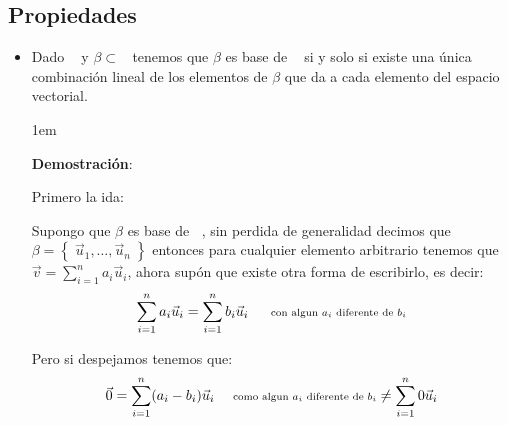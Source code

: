 \documentclass[12pt, fleqn]{report}                             %
\newenvironment{SmallIndentation}[1][0.75em]                    %
        {\begin{adjustwidth}{#1}{}\begin{footnotesize}}             %
        {\end{footnotesize}\end{adjustwidth}}                       %
\DeclareMathOperator \Space {\quad}                             %
\newcommand \Remember[1]{\Space\text{\scriptsize{#1}}}          %
\theoremstyle{break}                                            %
\DeclareMathOperator \GenericField {\mathbb{F}}                 %
\DeclareMathOperator \VectorSet    {\mathbb{V}}                 %
\DeclareMathOperator \VectorSpace  {\VectorSet_{\GenericField}} %
\newcommand{\Set}[1]    {\left\{ \; #1 \; \right\}}             %
\begin{document}
            \clearpage
            \subsection{Propiedades}

                \begin{itemize}
                    
                    \item 
                        Dado $\VectorSpace$ y $\beta \subset \VectorSpace$  
                        tenemos que $\beta$ es base de $\VectorSpace$ si y solo si
                        existe una única combinación lineal de los elementos de $\beta$
                        que da a cada elemento del espacio vectorial.

                        \begin{SmallIndentation}[1em]
                            \textbf{Demostración}:

                            Primero la ida:

                            Supongo que $\beta$ es base de $\VectorSpace$, sin 
                            perdida de generalidad decimos que $\beta = \Set{\vec u_1, \dots, \vec u_n}$
                            entonces para cualquier elemento arbitrario tenemos
                            que $\vec v = \sum_{i=1}^n a_i \vec u_i$, ahora supón que existe
                            otra forma de escribirlo, es decir:
                            \begin{align*}
                                \sum_{i=1}^n a_i \vec u_i = \sum_{i=1}^n b_i \vec u_i
                                    \Remember{ con algun $a_i$ diferente de $b_i$}
                            \end{align*}

                            Pero si despejamos tenemos que:
                            \begin{align*}
                                \vec  0 
                                    = \sum_{i=1}^n (a_i-b_i) \vec u_i
                                    \Remember{como algun $a_i$ diferente de $b_i$} 
                                    \neq \sum_{i=1}^n 0 \vec u_i
                            \end{align*}


\end{SmallIndentation}
\end{itemize}
\end{document}
